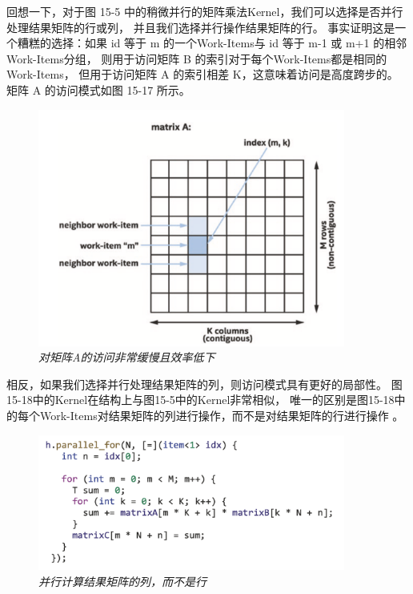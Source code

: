 回想一下，对于图 15-5 中的稍微并行的矩阵乘法Kernel，我们可以选择是否并行处理结果矩阵的行或列，
并且我们选择并行操作结果矩阵的行。 
事实证明这是一个糟糕的选择：如果 id 等于 m 的一个Work-Items与 id 等于 m-1 或 m+1 的相邻Work-Items分组，
则用于访问矩阵 B 的索引对于每个Work-Items都是相同的 Work-Items，
但用于访问矩阵 A 的索引相差 K，这意味着访问是高度跨步的。 
矩阵 A 的访问模式如图 15-17 所示。

\begin{figure}[H]
	\centering
	\includegraphics[width=0.9\textwidth]{figs/F15.17.png}
	\caption{\textit{对矩阵A的访问非常缓慢且效率低下}}
\end{figure}

相反，如果我们选择并行处理结果矩阵的列，则访问模式具有更好的局部性。 
图15-18中的Kernel在结构上与图15-5中的Kernel非常相似，
唯一的区别是图15-18中的每个Work-Items对结果矩阵的列进行操作，而不是对结果矩阵的行进行操作 。

\begin{figure}[H]
	\centering
	\includegraphics[width=0.9\textwidth]{figs/F15.18.png}
	\caption{\textit{并行计算结果矩阵的列，而不是行}}
\end{figure}

